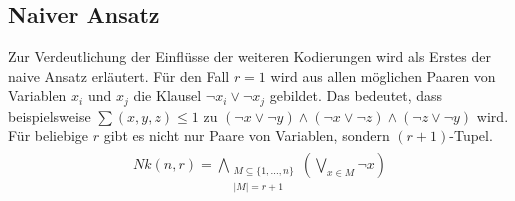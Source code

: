 \documentclass[a4,abstract=on]{scrartcl}
\begin{document}

	\subsection{Naiver Ansatz}
Zur Verdeutlichung der Einflüsse der weiteren Kodierungen wird als Erstes der naive Ansatz \cite[vgl.][]{sinz} erläutert. Für den Fall $r=1$ wird aus allen möglichen Paaren von Variablen $x_i$ und $x_j$ die Klausel $\neg x_i \vee \neg x_j$ gebildet. Das bedeutet, dass beispielsweise $\sum(x,y,z)\leq1$ zu $(\neg x \vee \neg y) \wedge (\neg x \vee \neg z) \wedge (\neg z \vee \neg y)$ wird.
Für beliebige $r$ gibt es nicht nur Paare von Variablen, sondern $(r+1)$-Tupel.\\
\begin{align*}
\begin{aligned}
Nk (n, r) = \bigwedge_{\substack{M\subseteq \{1, \dots, n\} \\  |M|=r+1}} (\bigvee_{x \in M} {\neg x})
\end{aligned}
\end{align*}

\end{document}
